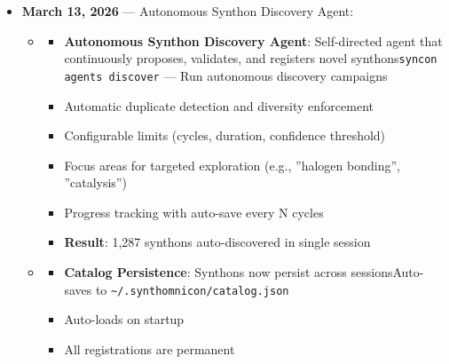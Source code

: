 \documentclass[12pt,a4paper]{article}
\begin{document}
\begin{itemize}
\begin{itemize}
    \item 
    \begin{itemize}
    \item \textbf{Updated Documentation}:README.md --- Updated for 9 primitives, axiom-guided generation
    \item USAGE.md --- Comprehensive v2.0 usage guide
    \item commit.txt --- Implementation summary
\end{itemize}

    \item \textbf{All integration tests passing} (6/6)
\end{itemize}

    \item 
    \textbf{March 13, 2026} --- Autonomous Synthon Discovery Agent:

    \begin{itemize}
    \item 
    \begin{itemize}
    \item \textbf{Autonomous Synthon Discovery Agent}: Self-directed agent that continuously proposes, validates, and registers novel synthons\texttt{syncon agents discover} --- Run autonomous discovery campaigns
    \item Automatic duplicate detection and diversity enforcement
    \item Configurable limits (cycles, duration, confidence threshold)
    \item Focus areas for targeted exploration (e.g., ''halogen bonding'', ''catalysis'')
    \item Progress tracking with auto-save every N cycles
    \item \textbf{Result}: 1,287 synthons auto-discovered in single session
\end{itemize}

    \item 
    \begin{itemize}
    \item \textbf{Catalog Persistence}: Synthons now persist across sessionsAuto-saves to \texttt{\textasciitilde{}/.synthomnicon/catalog.json}
    \item Auto-loads on startup
    \item All registrations are permanent
\end{itemize}


\end{itemize}
\end{itemize}
\end{document}
